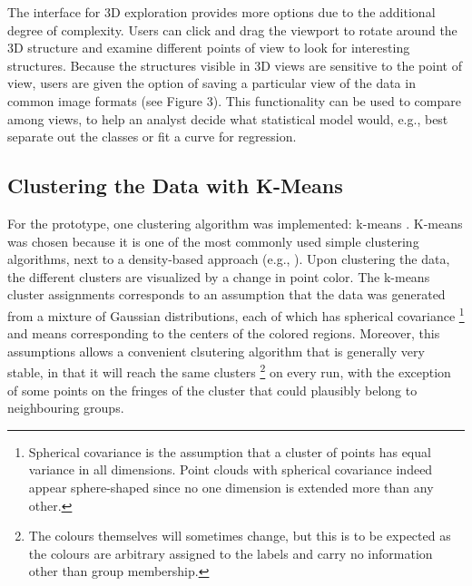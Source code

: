 \documentclass{sigchi}
\begin{document}
The interface for 3D exploration provides more options due to the additional degree of complexity. %
%
Users can click and drag the viewport to rotate around the 3D structure and examine different points of view to look for interesting structures. %
%
Because the structures visible in 3D views are sensitive to the point of view, users are given the option of saving a particular view of the data in common image formats (see Figure 3). %
%
This functionality can be used to compare among views, to help an analyst decide what statistical model would, e.g., best separate out the classes or fit a curve for regression.%
%
\subsection{Clustering the Data with K-Means}
%
For the prototype, one clustering algorithm was implemented: k-means \cite{hartigan1979algorithm}. %
%
K-means was chosen because it is one of the most commonly used simple clustering algorithms, next to a density-based approach (e.g., \cite{ester1996density}).
%
Upon clustering the data, the different clusters are visualized by a change in point color. %
%
The k-means cluster assignments corresponds to an assumption that the data was generated from a mixture of Gaussian distributions, each of which has spherical covariance %
%
\footnote{Spherical covariance is the assumption that a cluster of points has equal variance in all dimensions. Point clouds with spherical covariance indeed appear sphere-shaped since no one dimension is extended more than any other.}%
%
and means corresponding to the centers of the colored regions. %
%
Moreover, this assumptions allows a convenient clsutering algorithm that is generally very stable, in that it will reach the same clusters %
%
\footnote{The colours themselves will sometimes change, but this is to be expected as the colours are arbitrary assigned to the labels and carry no information other than group membership.}%
%
on every run, with the exception of some points on the fringes of the cluster that could plausibly belong to neighbouring groups. %
%
\end{document}
